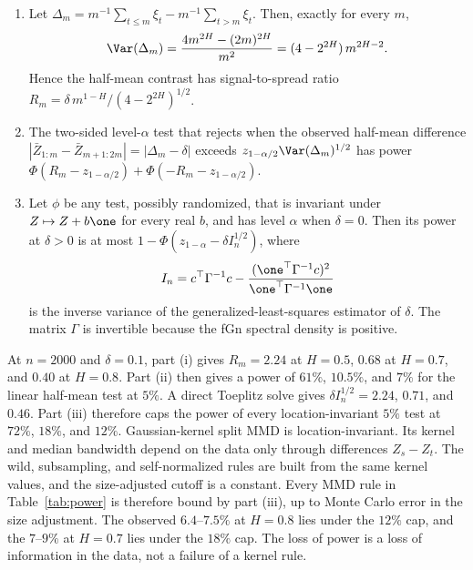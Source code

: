 \begin{proposition}\label{prop:halfmean}
\begin{enumerate}[label=(\roman*),nosep]
\item Let $\Delta_m=m^{-1}\sum_{t\le m}\xi_t-m^{-1}\sum_{t>m}\xi_t$. Then, exactly for every $m$,
\begin{equation}\label{eq:halfvar}
\Var(\Delta_m)=\frac{4m^{2H}-(2m)^{2H}}{m^2}=(4-2^{2H})\,m^{2H-2}.
\end{equation}
Hence the half-mean contrast has signal-to-spread ratio $R_m=\delta\,m^{1-H}/(4-2^{2H})^{1/2}$.
\item The two-sided level-$\alpha$ test that rejects when the observed half-mean difference $|\bar Z_{1:m}-\bar Z_{m+1:2m}|=|\Delta_m-\delta|$ exceeds $z_{1-\alpha/2}\Var(\Delta_m)^{1/2}$ has power $\Phi(R_m-z_{1-\alpha/2})+\Phi(-R_m-z_{1-\alpha/2})$.
\item Let $\phi$ be any test, possibly randomized, that is invariant under $Z\mapsto Z+b\one$ for every real $b$, and has level $\alpha$ when $\delta=0$. Then its power at $\delta>0$ is at most $1-\Phi(z_{1-\alpha}-\delta I_n^{1/2})$, where
\begin{equation}\label{eq:info}
I_n=c^\top\Gamma^{-1}c-\frac{(\one^\top\Gamma^{-1}c)^2}{\one^\top\Gamma^{-1}\one}
\end{equation}
is the inverse variance of the generalized-least-squares estimator of $\delta$. The matrix $\Gamma$ is invertible because the fGn spectral density is positive.
\end{enumerate}
\end{proposition}

At $n=2000$ and $\delta=0.1$, part (i) gives $R_m=2.24$ at $H=0.5$, $0.68$ at $H=0.7$, and $0.40$ at $H=0.8$. Part (ii) then gives a power of $61\%$, $10.5\%$, and $7\%$ for the linear half-mean test at $5\%$. A direct Toeplitz solve gives $\delta I_n^{1/2}=2.24$, $0.71$, and $0.46$. Part (iii) therefore caps the power of every location-invariant $5\%$ test at $72\%$, $18\%$, and $12\%$. Gaussian-kernel split MMD is location-invariant. Its kernel and median bandwidth depend on the data only through differences $Z_s-Z_t$. The wild, subsampling, and self-normalized rules are built from the same kernel values, and the size-adjusted cutoff is a constant. Every MMD rule in Table~\ref{tab:power} is therefore bound by part (iii), up to Monte Carlo error in the size adjustment. The observed $6.4$--$7.5\%$ at $H=0.8$ lies under the $12\%$ cap, and the $7$--$9\%$ at $H=0.7$ lies under the $18\%$ cap. The loss of power is a loss of information in the data, not a failure of a kernel rule.

